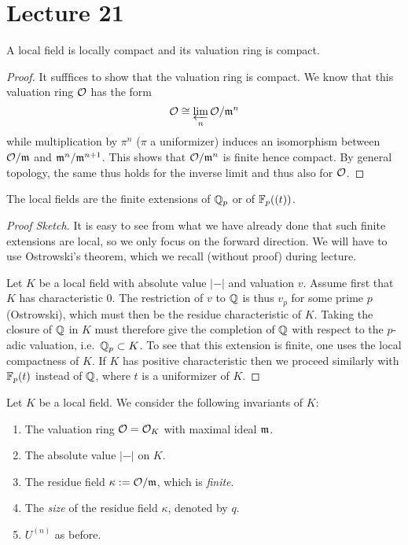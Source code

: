 \section{Lecture 21}

\begin{proposition}
  A local field is locally compact and its valuation ring is compact.
\end{proposition}
\begin{proof}
  It sufffices to show that the valuation ring is compact.
  We know that this valuation ring $\mathcal{O}$ has the form
  \[ \mathcal{O} \cong \varprojlim_{n} \mathcal{O}/\mathfrak{m}^{n} \]
  while multiplication by $\pi^{n}$ ($\pi$ a uniformizer) induces an isomorphism between $\mathcal{O}/\mathfrak{m}$ and $\mathfrak{m}^{n}/\mathfrak{m}^{n+1}$.
  This shows that $\mathcal{O}/\mathfrak{m}^{n}$ is finite hence compact.
  By general topology, the same thus holds for the inverse limit and thus also for $\mathcal{O}$.
\end{proof}

\begin{theorem}
  The local fields are the finite extensions of $\mathbb{Q}_{p}$ or of $\mathbb{F}_{p}((t))$.
\end{theorem}
\begin{proof}[Proof Sketch]
  It is easy to see from what we have already done that such finite extensions are local, so we only focus on the forward direction.
  We will have to use Ostrowski's theorem, which we recall (without proof) during lecture.

  Let $K$ be a local field with absolute value $|-|$ and valuation $v$.
  Assume first that $K$ has characteristic $0$.
  The restriction of $v$ to $\mathbb{Q}$ is thus $v_{p}$ for some prime $p$ (Ostrowski), which must then be the residue characteristic of $K$.
  Taking the closure of $\mathbb{Q}$ in $K$ must therefore give the completion of $\mathbb{Q}$ with respect to the $p$-adic valuation, i.e.~$\mathbb{Q}_{p} \subset K$.
  To see that this extension is finite, one uses the local compactness of $K$.
  If $K$ has positive characteristic then we proceed similarly with $\mathbb{F}_{p}(t)$ instead of $\mathbb{Q}$, where $t$ is a uniformizer of $K$.
\end{proof}

Let $K$ be a local field.
We consider the following invariants of $K$:
\begin{enumerate}
  \item The valuation ring $\mathcal{O} = \mathcal{O}_{K}$ with maximal ideal $\mathfrak{m}$.
  \item The absolute value $|-|$ on $K$.
  \item The residue field $\kappa := \mathcal{O}/\mathfrak{m}$, which is \emph{finite}.
  \item The \emph{size} of the residue field $\kappa$, denoted by $q$.
  \item $U^{(n)}$ as before.
\end{enumerate}

